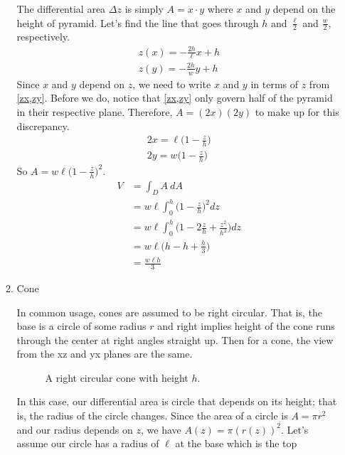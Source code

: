 \begin{enumerate}
\begin{enumerate}[label = (\alph*), ref = \theenumi{(\alph*)}]
\begin{figure}[H]
      \label{pyramid}
    \end{figure}
    The differential area \(\Delta z\) is simply \(A = x\cdot y\) where \(x\)
    and \(y\) depend on the height of pyramid.
    Let's find the line that goes through \(h\) and \(\frac{\ell}{2}\) and
    \(\frac{w}{2}\), respectively.
    \begin{gather}
      z(x) = -\frac{2h}{\ell}x + h\label{zx}\\
      z(y) = -\frac{2h}{w}y + h\label{zy}
    \end{gather}
    Since \(x\) and \(y\) depend on \(z\), we need to write \(x\) and \(y\) in
    terms of \(z\) from \cref{zx,zy}.
    Before we do, notice that \cref{zx,zy} only govern half of the pyramid in
    their respective plane.
    Therefore, \(A = (2x)(2y)\) to make up for this discrepancy.
    \begin{gather*}
      2x = \ell\bigg(1 - \frac{z}{h}\bigg)\\
      2y = w\bigg(1 - \frac{z}{h}\bigg)
    \end{gather*}
    So \(A = w\ell\big(1 - \frac{z}{h}\big)^2\).
    \begin{align*}
      V &= \int_DA \ dA\\
        &= w\ell\int_0^h\bigg(1 - \frac{z}{h}\bigg)^2dz\\
        &= w\ell\int_0^h \bigg(1 - 2\frac{z}{h} + \frac{z^2}{h^2}\bigg)dz\\
        &= w\ell\bigg(h - h + \frac{h}{3}\bigg)\\
        &= \frac{w\ell h}{3}
    \end{align*}
  \item
    \label{15d}
    Cone
    \par\smallskip
    In common usage, cones are assumed to be right circular.
    That is, the base is a circle of some radius \(r\) and right implies height
    of the cone runs through the center at right angles straight up.
    Then for a cone, the view from the xz and yx planes are the same.
    \begin{figure}[H]
      \centering
      
      \caption{A right circular cone with height \(h\).}
    \end{figure}
    In this case, our differential area is circle that depends on its height;
    that is, the radius of the circle changes.
    Since the area of a circle is \(A = \pi r^2\) and our radius depends on
    \(z\), we have \(A(z) = \pi (r(z))^2\).
    Let's assume our circle has a radius of \(\ell\) at the base which is the top

\end{enumerate}
\end{enumerate}
